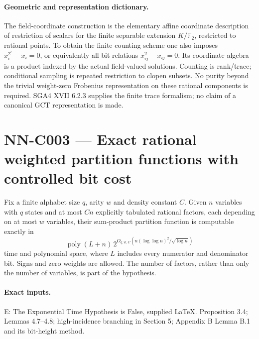 \paragraph{Geometric and representation dictionary.}
The field-coordinate construction is the elementary affine coordinate description of restriction of scalars for the finite separable extension $K/\mathbb F_2$, restricted to rational points. To obtain the finite counting scheme one also imposes $x_i^{2^r}-x_i=0$, or equivalently all bit relations $x_{ij}^2-x_{ij}=0$. Its coordinate algebra is a product indexed by the actual field-valued solutions. Counting is rank/trace; conditional sampling is repeated restriction to clopen subsets. No purity beyond the trivial weight-zero Frobenius representation on these rational components is required. SGA4 XVII 6.2.3 supplies the finite trace formalism; no claim of a canonical GCT representation is made.



\section{NN-C003 --- Exact rational weighted partition functions with controlled bit cost}
\begin{proposition}[NN-C003]
Fix a finite alphabet size $q$, arity $w$ and density constant $C$. Given $n$ variables with $q$ states and at most $Cn$ explicitly tabulated rational factors, each depending on at most $w$ variables, their sum-product partition function is computable exactly in
\[
 \operatorname{poly}(L+n)\,
 2^{O_{q,w,C}(n(\log\log n)^2/\sqrt{\log n})}
\]
time and polynomial space, where $L$ includes every numerator and denominator bit. Signs and zero weights are allowed. The number of factors, rather than only the number of variables, is part of the hypothesis.
\end{proposition}
\paragraph{Exact inputs.}
E: The Exponential Time Hypothesis is False, supplied LaTeX. Proposition 3.4; Lemmas 4.7--4.8; high-incidence branching in Section 5; Appendix B Lemma B.1 and its bit-height method.


